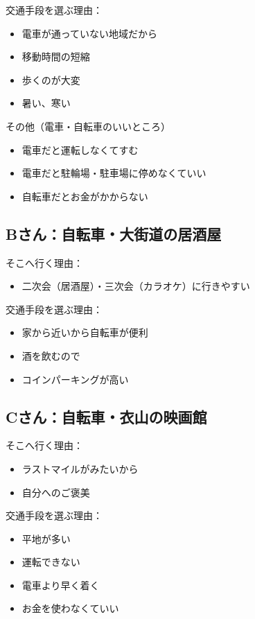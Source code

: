 \documentclass[a4paper,12pt, uplatex]{jsbook}
\begin{document}
交通手段を選ぶ理由：
\begin{itemize}
  \item 電車が通っていない地域だから
  \item 移動時間の短縮
  \item 歩くのが大変
  \item 暑い、寒い
\end{itemize}

その他（電車・自転車のいいところ）
\begin{itemize}
  \item 電車だと運転しなくてすむ
  \item 電車だと駐輪場・駐車場に停めなくていい
  \item 自転車だとお金がかからない
\end{itemize}

\subsection{Bさん：自転車・大街道の居酒屋}
そこへ行く理由：
\begin{itemize}
  \item 二次会（居酒屋）・三次会（カラオケ）に行きやすい
\end{itemize}

交通手段を選ぶ理由：
\begin{itemize}
  \item 家から近いから自転車が便利
  \item 酒を飲むので
  \item コインパーキングが高い
\end{itemize}

\subsection{Cさん：自転車・衣山の映画館}
そこへ行く理由：
\begin{itemize}
  \item ラストマイルがみたいから
  \item 自分へのご褒美
\end{itemize}

交通手段を選ぶ理由：
\begin{itemize}
  \item 平地が多い
  \item 運転できない
  \item 電車より早く着く
  \item お金を使わなくていい
\end{itemize}
\end{document}

